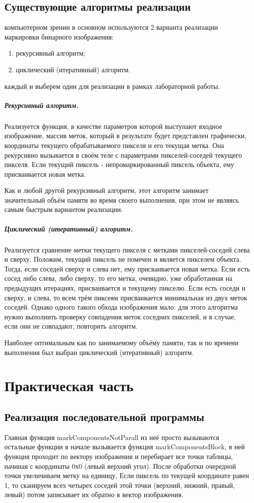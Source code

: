 \documentclass{report}
\begin{document}
\subsection{Существующие алгоритмы реализации}
 компьютерном зрении в основном используются 2 варианта реализации маркировки бинарного изображения:
\begin{enumerate}
    \item рекурсивный алгоритм;
    \item циклический (итеративный) алгоритм.
\end{enumerate}
 каждый и выберем один для реализации в рамках лабораторной работы.
\subparagraph {Рекурсивный алгоритм.}
\par Реализуется функция, в качестве параметров которой выступают входное изображение, массив меток, который в результате будет представлен графически, координаты текущего обрабатываемого пикселя и его текущая метка. Она рекурсивно вызывается в своём теле с параметрами пикселей-соседей текущего пикселя. Если текущий пиксель - непромаркированный пиксель объекта, ему присваивается новая метка.
\par Как и любой другой рекурсивный алгоритм, этот алгоритм занимает значительный объём памяти во время своего выполнения, при этом не являясь самым быстрым вариантом реализации.
\subparagraph {Циклический (итеративный) алгоритм.}
\par Реализуется сравнение метки текущего пикселя с метками пикселей-соседей слева и сверху. Положим, текущий пиксель не помечен и является пикселем объекта. Тогда, если соседей сверху и слева нет, ему присваивается новая метка. Если  есть сосед либо слева, либо сверху, то его метка, очевидно, уже обработанная на предыдущих итерациях, присваивается и текущему пикселю. Если есть соседи и сверху, и слева, то всем трём пиксеям присваивается минимальная из двух меток соседей. Однако одного такого обхода изображения мало: для этого алгоритма нужно выполнить проверку совпадения меток соседних пикселей, и в случае, если они не совпадают, повторить алгоритм.
\par Наиболее оптимальным как по занимаемому объёму памяти, так и по времени выполнения был выбран циклический (итеративный) алгоритм.
\newpage

\section*{Практическая часть}
\subsection{Реализация последовательной программы}
Главная функция markComponentsNotParall из неё просто вызываются остальные функции в начале вызывается функция markComponentsBlock, в ней функция проходит по вектору изображения
и перебирает все точки таблицы, начиная с координаты 0х0 (левый верхний угол).
После обработки очередной точки увеличиваем метку на единицу,
Если пиксель по текущей координате равен 1,
то сканируем всех четырех соседей этой точки (верхний, нижний, правый, левый)
потом записывает их обратно в вектор изображения.
\end{document}
